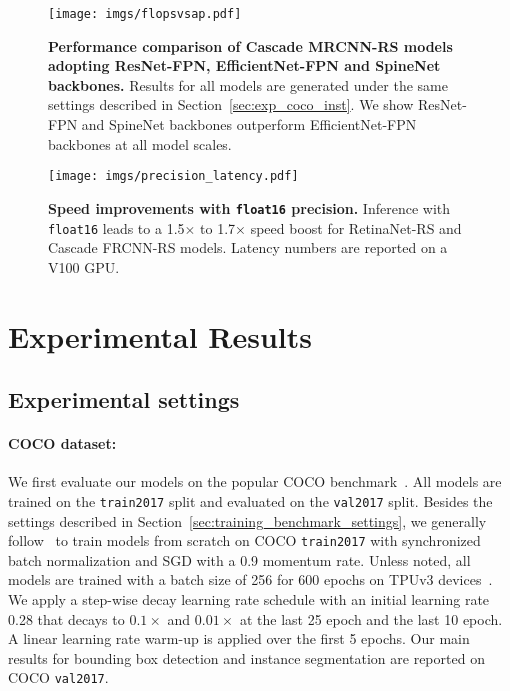 \documentclass[final]{cvpr}
\begin{document}
\begin{figure}
    \texttt{[image: imgs/flopsvsap.pdf]}
    \caption{\textbf{Performance comparison of Cascade MRCNN-RS models adopting ResNet-FPN, EfficientNet-FPN and SpineNet backbones.} Results for all models are generated under the same settings described in Section~\ref{sec:exp_coco_inst}. We show ResNet-FPN and SpineNet backbones outperform EfficientNet-FPN backbones at all model scales.}
    \label{fig:inst_seg_curves}
\vspace*{-0mm}
\end{figure}
\begin{figure}
    \texttt{[image: imgs/precision\_latency.pdf]}
    \caption{\textbf{Speed improvements with \texttt{float16} precision.} Inference with \texttt{float16} leads to a 1.5$\times$ to 1.7$\times$ speed boost for RetinaNet-RS and Cascade FRCNN-RS models. Latency numbers are reported on a V100 GPU.}
\label{fig:precision_comp}
\vspace{-0mm}
\end{figure}

\section{Experimental Results}\label{sec:experiments}
\subsection{Experimental settings}
\paragraph{COCO dataset:}
We first evaluate our models on the popular COCO benchmark~\cite{coco}. All models are trained on the \texttt{train2017} split and evaluated on the \texttt{val2017} split. Besides the settings described in Section~\ref{sec:training_benchmark_settings}, we generally follow~\cite{spinenet,Du2020EfficientSB,efficientdet} to train models from scratch on COCO \texttt{train2017} with synchronized batch normalization and SGD with a 0.9 momentum rate. Unless noted, all models are trained with a batch size of 256 for 600 epochs on TPUv3 devices~\cite{jouppi2017tpu}. We apply a step-wise decay learning rate schedule with an initial learning rate 0.28 that decays to $0.1\times$ and $0.01\times$ at the last 25 epoch and the last 10 epoch. A linear learning rate warm-up is applied over the first 5 epochs. Our main results for bounding box detection and instance segmentation are reported on COCO \texttt{val2017}.
\end{document}
